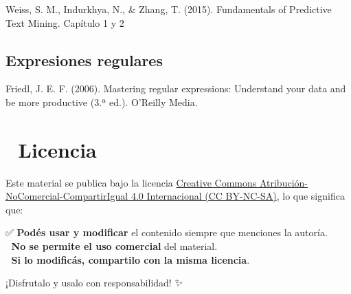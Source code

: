 \documentclass[
  letterpaper,
  DIV=11,
  numbers=noendperiod]{scrreprt}
\begin{document}
Weiss, S. M., Indurkhya, N., \& Zhang, T. (2015). Fundamentals of
Predictive Text Mining. Capítulo 1 y 2

\section{Expresiones regulares}\label{expresiones-regulares}

Friedl, J. E. F. (2006). Mastering regular expressions: Understand your
data and be more productive (3.ª ed.). O'Reilly Media.

\chapter{📜 Licencia}\label{licencia}

Este material se publica bajo la licencia
\href{https://creativecommons.org/licenses/by-nc-sa/4.0/}{Creative
Commons Atribución-NoComercial-CompartirIgual 4.0 Internacional (CC
BY-NC-SA)}, lo que significa que:

✅ \textbf{Podés usar y modificar} el contenido siempre que menciones la
autoría.\\
🚫 \textbf{No se permite el uso comercial} del material.\\
🔄 \textbf{Si lo modificás, compartilo con la misma licencia}.

¡Disfrutalo y usalo con responsabilidad! ✨
\end{document}
